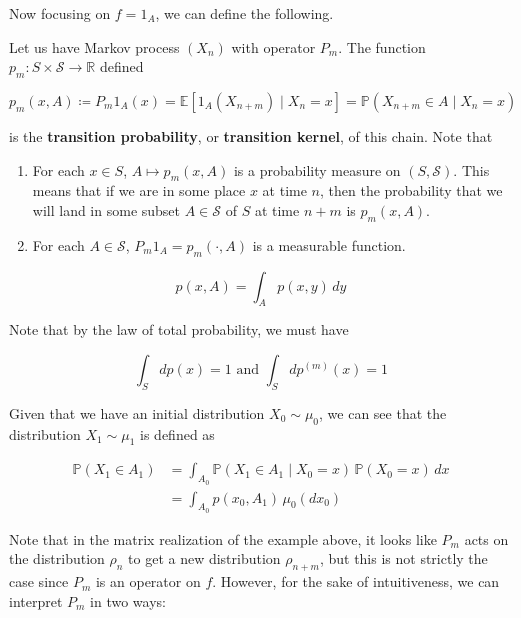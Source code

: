 \documentclass{article}
\begin{document}
  Now focusing on $f = 1_A$, we can define the following. 

  \begin{definition}
    Let us have Markov process $(X_n)$ with operator $P_m$. The function $p_m: S \times \mathcal{S} \rightarrow \mathbb{R}$ defined 

      \[p_m(x, A) \coloneqq P_m 1_A (x) = \mathbb{E}[ 1_A (X_{n+m}) \mid X_n = x] = \mathbb{P}(X_{n + m} \in A \mid X_n = x)\]

    is the \textbf{transition probability}, or \textbf{transition kernel}, of this chain. Note that 

    \begin{enumerate}
      \item For each $x \in S$, $A \mapsto p_m(x, A)$ is a probability measure on $(S, \mathcal{S})$. This means that if we are in some place $x$ at time $n$, then the probability that we will land in some subset $A \in \mathcal{S}$ of $S$ at time $n+m$ is $p_m(x, A)$. 
      \item For each $A \in \mathcal{S}$, $P_m 1_A = p_m (\cdot, A)$ is a measurable function. 
    \end{enumerate}



      \[p(x, A) = \int_A p(x, y) \,dy\]
  \end{definition}

  Note that by the law of total probability, we must have 

    \[\int_S dp(x) = 1 \text{ and } \int_S dp^{(m)} (x) = 1\]

  Given that we have an initial distribution $X_0 \sim \mu_0$, we can see that the distribution $X_1 \sim \mu_1$ is defined as 

  \begin{align*}
    \mathbb{P}(X_1 \in A_1) & = \int_{A_0} \mathbb{P}(X_1 \in A_1 \mid X_0 = x) \, \mathbb{P}(X_0 = x) \,dx \\
    & = \int_{A_0} p(x_0, A_1) \, \mu_0 (d x_0) 
  \end{align*}

  Note that in the matrix realization of the example above, it looks like $P_m$ acts on the distribution $\rho_n$ to get a new distribution $\rho_{n + m}$, but this is not strictly the case since $P_m$ is an operator on $f$. However, for the sake of intuitiveness, we can interpret $P_m$ in two ways: 
\end{document}
